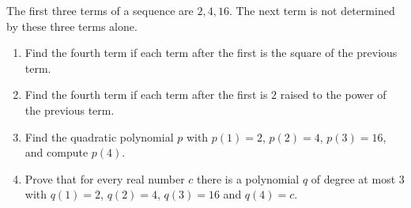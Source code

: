 The first three terms of a sequence are $2,4,16$. The next term is not determined by these three terms alone.
\begin{enumerate}
\item[(a)] Find the fourth term if each term after the first is the square of the previous term.
\item[(b)] Find the fourth term if each term after the first is $2$ raised to the power of the previous term.
\item[(c)] Find the quadratic polynomial $p$ with $p(1)=2$, $p(2)=4$, $p(3)=16$, and compute $p(4)$.
\item[(d)] Prove that for every real number $c$ there is a polynomial $q$ of degree at most $3$ with $q(1)=2$, $q(2)=4$, $q(3)=16$ and $q(4)=c$.
\end{enumerate}
